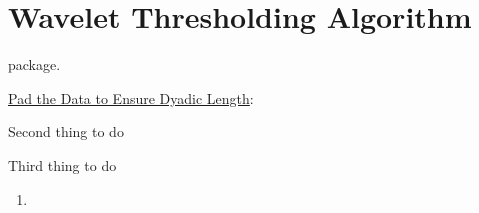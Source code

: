 \section{Wavelet Thresholding Algorithm}

\item {}  package.

\begin{steps}
  \item \underline{Pad the Data to Ensure Dyadic Length}:
  \item Second thing to do
  \item Third thing to do
\end{steps}

\begin{enumerate}
    \item 
\end{enumerate}
